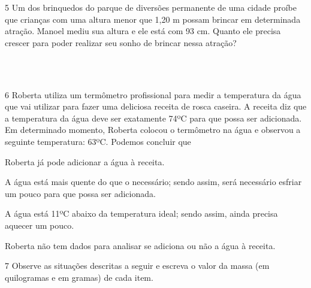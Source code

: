 \num{5} Um dos brinquedos do parque de diversões permanente de uma cidade proíbe
que crianças com uma altura menor que 1,20 m possam brincar em determinada
atração. Manoel mediu sua altura e ele está com 93 cm. Quanto ele
precisa crescer para poder realizar seu sonho de brincar nessa atração?

\begin{mdframed}[linewidth=2pt,linecolor=salmao,roundcorner=2pt]
\\
\\
\end{mdframed}

\num{6} Roberta utiliza um termômetro profissional para medir a temperatura da
água que vai utilizar para fazer uma deliciosa receita de rosca
caseira. A receita diz que a temperatura da água deve ser exatamente 74ºC
para que possa ser adicionada. Em determinado momento, Roberta colocou
o termômetro na água e observou a seguinte temperatura: 63ºC. Podemos concluir que

\begin{escolha}
\item
  Roberta já pode adicionar a água à receita.
\item
  A água está mais quente do que o necessário; sendo assim, será
  necessário esfriar um pouco para que possa ser adicionada.
\item
  A água está 11ºC abaixo da temperatura ideal; sendo assim, ainda
  precisa aquecer um pouco.
\item
  Roberta não tem dados para analisar se adiciona ou não a água à receita.
\end{escolha}


\num{7} Observe as situações descritas a seguir e escreva o valor da massa (em quilogramas e em gramas) de cada item.

